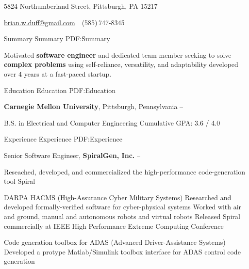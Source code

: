 \documentclass[letterpaper,MMMyyyy,nonstopmode]{simpleresumecv}
\newcommand{\CVAuthor}{Brian W. Duff}
\begin{document}

\Title{\CVAuthor}

\begin{SubTitle}
5824 Northumberland Street, Pittsburgh, PA 15217
\par
\href{mailto:brian.w.duff@gmail.com}
{brian.w.duff@gmail.com}
\,\SubBulletSymbol\,
(585)\,747-8345
\end{SubTitle}

\begin{Body}


\Section
{Summary}
{Summary}
{PDF:Summary}

\Entry
Motivated \textbf{software engineer} and dedicated team member seeking to solve \textbf{complex problems} using self-reliance, versatility, and adaptability developed over 4 years at a fast-paced startup. 



\Section
{Education}
{Education}
{PDF:Education}

\Entry
\textbf{Carnegie Mellon University},
Pittsburgh, Pennsylvania
\hfill
{} --


\Gap
\BulletItem
B.S. in
Electrical and Computer Engineering
\SubBulletItem
Cumulative GPA: 3.6 / 4.0




\Section
{Experience}
{Experience}
{PDF:Experience}

\Entry
Senior Software Engineer,
\textbf{SpiralGen, Inc.}
\hfill
{} --

\BigGap
Reseached, developed, and commercialized the high-performance code-generation tool Spiral

\BigGap

\BulletItem
DARPA HACMS (High-Assurance Cyber Military Systems)
\SubBulletItem
Researched and developed formally-verified software for cyber-physical systems
\SubBulletItem
Worked with air and ground, manual and autonomous robots and virtual robots
\SubBulletItem
Released Spiral commercially at IEEE High Performance Extreme Computing Conference
\Gap

\BulletItem
Code generation toolbox for ADAS (Advanced Driver-Assistance Systems)
\SubBulletItem
Developed a protype Matlab/Simulink toolbox interface for ADAS control code generation
\Gap


\end{Body}
\end{document}
